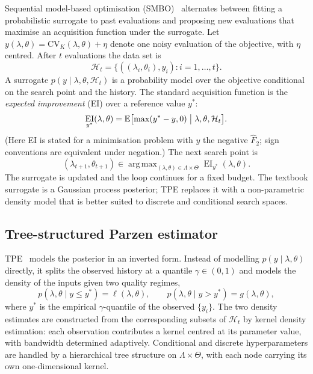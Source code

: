 \documentclass[onluarkali,ingilizce,yukseklisans,karton,LisansustuEgitim]{itutez}
\DeclareMathOperator{\EI}{EI}
\DeclareMathOperator*{\argmax}{arg\,max}
\providecommand{\E}{\mathbb{E}}
\providecommand{\1}{\mathbf{1}}
\begin{document}
Sequential model-based optimisation (SMBO)~\parencite{hutter2011sequential} alternates between fitting a probabilistic surrogate to past evaluations and proposing new evaluations that maximise an acquisition function under the surrogate. Let $y(\lambda,\theta)=\mathrm{CV}_K(\lambda,\theta)+\eta$ denote one noisy evaluation of the objective, with $\eta$ centred. After $t$ evaluations the data set is
\[
  \mathcal{H}_t=\bigl\{((\lambda_i,\theta_i),y_i):i=1,\ldots,t\bigr\}.
\]
A surrogate $p(y\mid\lambda,\theta,\mathcal{H}_t)$ is a probability model over the objective conditional on the search point and the history. The standard acquisition function is the \emph{expected improvement} (EI) over a reference value $y^*$:
\begin{equation}
  \EI_{y^*}(\lambda,\theta)=\E\bigl[\max(y^*-y,0)\bigm|\lambda,\theta,\mathcal{H}_t\bigr].
  \label{eq:ei}
\end{equation}
(Here EI is stated for a minimisation problem with $y$ the negative $\widehat F_2$; sign conventions are equivalent under negation.) The next search point is
\begin{equation}
  (\lambda_{t+1},\theta_{t+1})\in\argmax_{(\lambda,\theta)\in\Lambda\times\Theta}\EI_{y^*}(\lambda,\theta).
  \label{eq:smbo-step}
\end{equation}
The surrogate is updated and the loop continues for a fixed budget. The textbook surrogate is a Gaussian process posterior; TPE replaces it with a non-parametric density model that is better suited to discrete and conditional search spaces.

\subsection{Tree-structured Parzen estimator}
\label{subsubsec:tpe}

TPE~\parencite{bergstra2011algorithms} models the posterior in an inverted form. Instead of modelling $p(y\mid\lambda,\theta)$ directly, it splits the observed history at a quantile $\gamma\in(0,1)$ and models the density of the inputs given two quality regimes,
\[
  p(\lambda,\theta\mid y\leq y^*)=\ell(\lambda,\theta),
  \qquad
  p(\lambda,\theta\mid y>y^*)=g(\lambda,\theta),
\]
where $y^*$ is the empirical $\gamma$-quantile of the observed $\{y_i\}$. The two density estimates are constructed from the corresponding subsets of $\mathcal{H}_t$ by kernel density estimation: each observation contributes a kernel centred at its parameter value, with bandwidth determined adaptively. Conditional and discrete hyperparameters are handled by a hierarchical tree structure on $\Lambda\times\Theta$, with each node carrying its own one-dimensional kernel.
\end{document}
